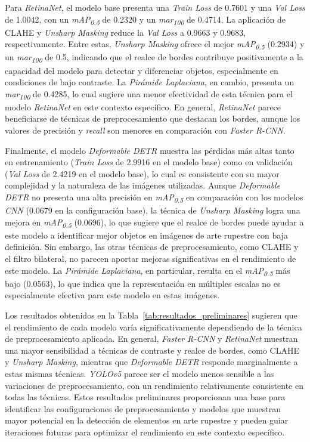 Para \textit{RetinaNet}, el modelo base presenta una \textit{Train Loss} de 0.7601 y una \textit{Val Loss} de 1.0042, con un \textit{mAP\textsubscript{0.5}} de 0.2320 y un \textit{mar\textsubscript{100}} de 0.4714.
La aplicación de CLAHE y \textit{Unsharp Masking} reduce la \textit{Val Loss} a 0.9663 y 0.9683, respectivamente.
Entre estas, \textit{Unsharp Masking} ofrece el mejor \textit{mAP\textsubscript{0.5}} (0.2934) y un \textit{mar\textsubscript{100}} de 0.5, indicando que el realce de bordes contribuye positivamente a la capacidad del modelo para detectar y diferenciar objetos, especialmente en condiciones de bajo contraste.
La \textit{Pirámide Laplaciana}, en cambio, presenta un \textit{mar\textsubscript{100}} de 0.4285, lo cual sugiere una menor efectividad de esta técnica para el modelo \textit{RetinaNet} en este contexto específico.
En general, \textit{RetinaNet} parece beneficiarse de técnicas de preprocesamiento que destacan los bordes, aunque los valores de precisión y \textit{recall} son menores en comparación con \textit{Faster R-CNN}.

Finalmente, el modelo \textit{Deformable DETR} muestra las pérdidas más altas tanto en entrenamiento (\textit{Train Loss} de 2.9916 en el modelo base) como en validación (\textit{Val Loss} de 2.4219 en el modelo base), lo cual es consistente con su mayor complejidad y la naturaleza de las imágenes utilizadas.
Aunque \textit{Deformable DETR} no presenta una alta precisión en \textit{mAP\textsubscript{0.5}} en comparación con los modelos \textit{CNN} (0.0679 en la configuración base), la técnica de \textit{Unsharp Masking} logra una mejora en \textit{mAP\textsubscript{0.5}} (0.0696), lo que sugiere que el realce de bordes puede ayudar a este modelo a identificar mejor objetos en imágenes de arte rupestre con baja definición.
Sin embargo, las otras técnicas de preprocesamiento, como CLAHE y el filtro bilateral, no parecen aportar mejoras significativas en el rendimiento de este modelo.
La \textit{Pirámide Laplaciana}, en particular, resulta en el \textit{mAP\textsubscript{0.5}} más bajo (0.0563), lo que indica que la representación en múltiples escalas no es especialmente efectiva para este modelo en estas imágenes.

Los resultados obtenidos en la Tabla~\ref{tab:resultados_preliminares} sugieren que el rendimiento de cada modelo varía significativamente dependiendo de la técnica de preprocesamiento aplicada.
En general, \textit{Faster R-CNN} y \textit{RetinaNet} muestran una mayor sensibilidad a técnicas de contraste y realce de bordes, como CLAHE y \textit{Unsharp Masking}, mientras que \textit{Deformable DETR} responde marginalmente a estas mismas técnicas.
\textit{YOLOv5} parece ser el modelo menos sensible a las variaciones de preprocesamiento, con un rendimiento relativamente consistente en todas las técnicas.
Estos resultados preliminares proporcionan una base para identificar las configuraciones de preprocesamiento y modelos que muestran mayor potencial en la detección de elementos en arte rupestre y pueden guiar iteraciones futuras para optimizar el rendimiento en este contexto específico.

